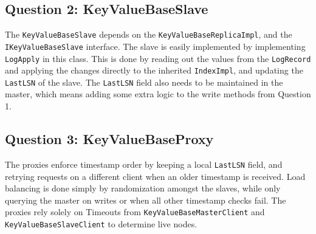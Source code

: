 \documentclass[11pt,a4paper]{article}
\begin{document}
\subsection{Question 2: KeyValueBaseSlave}
The {\tt KeyValueBaseSlave} depends on the {\tt KeyValueBaseReplicaImpl}, and the {\tt IKeyValueBaseSlave} interface. The slave is easily implemented by
implementing {\tt LogApply} in this class. This is done by reading out the values from the {\tt LogRecord} and applying the changes directly to the inherited {\tt IndexImpl},
and updating the {\tt LastLSN} of the slave.
The {\tt LastLSN} field also needs to be maintained in the master, which means adding some extra logic to the write methods from Question 1.

\subsection{Question 3: KeyValueBaseProxy}
The proxies enforce timestamp order by keeping a local {\tt LastLSN} field, and retrying requests on a different client when an older timestamp is received.
Load balancing is done simply by randomization amongst the slaves, while only querying the master on writes or when all other timestamp checks fail.
The proxies rely solely on Timeouts from {\tt KeyValueBaseMasterClient} and {\tt KeyValueBaseSlaveClient} to determine live nodes.
\end{document}
